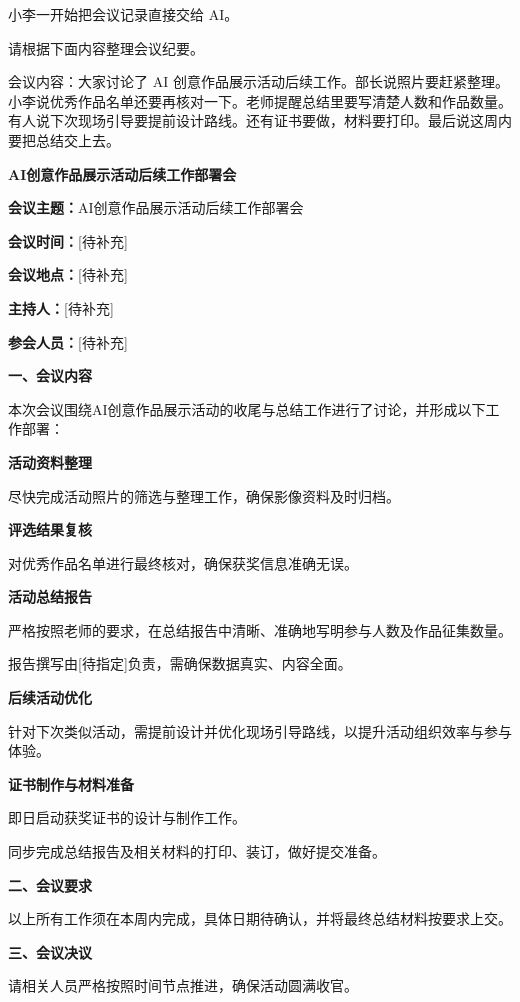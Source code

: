 小李一开始把会议记录直接交给 AI。

\begin{userbox}
请根据下面内容整理会议纪要。

会议内容：大家讨论了 AI 创意作品展示活动后续工作。部长说照片要赶紧整理。小李说优秀作品名单还要再核对一下。老师提醒总结里要写清楚人数和作品数量。有人说下次现场引导要提前设计路线。还有证书要做，材料要打印。最后说这周内要把总结交上去。
\end{userbox}

\begin{aibox}
\begin{center}
\textbf{AI创意作品展示活动后续工作部署会}
\end{center}

\textbf{会议主题：}AI创意作品展示活动后续工作部署会

\textbf{会议时间：}[待补充]

\textbf{会议地点：}[待补充]

\textbf{主持人：}[待补充]

\textbf{参会人员：}[待补充]

\textbf{一、会议内容}

本次会议围绕AI创意作品展示活动的收尾与总结工作进行了讨论，并形成以下工作部署：

\textbf{活动资料整理}

尽快完成活动照片的筛选与整理工作，确保影像资料及时归档。

\textbf{评选结果复核}

对优秀作品名单进行最终核对，确保获奖信息准确无误。

\textbf{活动总结报告}

严格按照老师的要求，在总结报告中清晰、准确地写明参与人数及作品征集数量。

报告撰写由[待指定]负责，需确保数据真实、内容全面。

\textbf{后续活动优化}

针对下次类似活动，需提前设计并优化现场引导路线，以提升活动组织效率与参与体验。

\textbf{证书制作与材料准备}

即日启动获奖证书的设计与制作工作。

同步完成总结报告及相关材料的打印、装订，做好提交准备。

\textbf{二、会议要求}

以上所有工作须在本周内完成，具体日期待确认，并将最终总结材料按要求上交。

\textbf{三、会议决议}

请相关人员严格按照时间节点推进，确保活动圆满收官。
\end{aibox}

